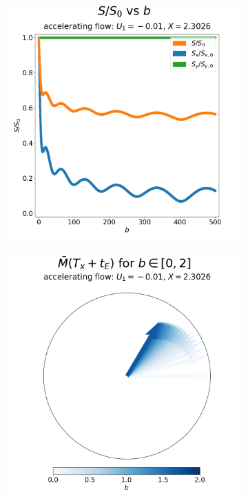 \begin{figure}
\begin{subfigure}{0.4\textwidth}
                    \includegraphics[width=\textwidth]{diagrams/results-mri/simple-tests/mri-spins_sall-vs-b_2D_accelerating_test_5.png}
                    \caption{}
                    \label{fig:mri-accelerating:s-vs-b}
                \end{subfigure}
                \begin{subfigure}{0.4\textwidth}
                    \centering
                    \includegraphics[width=\textwidth]{diagrams/results-mri/simple-tests/mri-spins_b_2D_accelerating_test_5.png}

\end{subfigure}
\end{figure}
